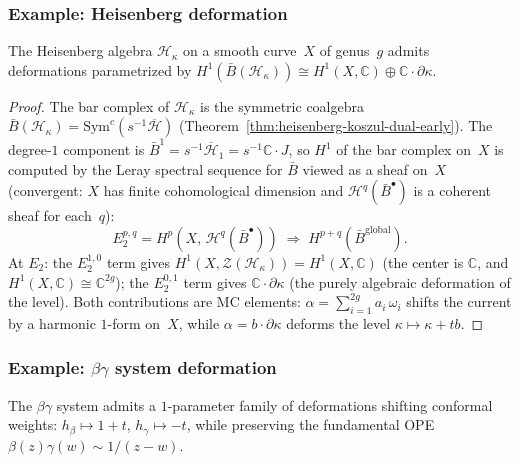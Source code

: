 \subsubsection{Example: Heisenberg deformation}

\begin{proposition}
\label{prop:deforming-heisenberg}
The Heisenberg algebra $\mathcal{H}_\kappa$ on a smooth curve~$X$ of
genus~$g$ admits deformations parametrized by
$H^1(\bar{B}(\mathcal{H}_\kappa)) \cong H^1(X, \mathbb{C}) \oplus
\mathbb{C} \cdot \partial\kappa$.
\end{proposition}

\begin{proof}
The bar complex of $\mathcal{H}_\kappa$ is the symmetric coalgebra
$\bar{B}(\mathcal{H}_\kappa) = \mathrm{Sym}^c(s^{-1}\overline{\mathcal{H}})$
(Theorem~\ref{thm:heisenberg-koszul-dual-early}).  The degree-$1$
component is $\bar{B}^1 = s^{-1}\overline{\mathcal{H}}_1 = s^{-1}
\mathbb{C} \cdot J$, so $H^1$ of the bar complex on~$X$ is computed
by the Leray spectral sequence for $\bar{B}$ viewed as a sheaf
on~$X$ (convergent: $X$ has finite cohomological dimension and
$\mathcal{H}^q(\bar{B}^\bullet)$ is a coherent sheaf for each~$q$):
\[
E_2^{p,q} = H^p(X,\, \mathcal{H}^q(\bar{B}^{\bullet}))
\;\Longrightarrow\; H^{p+q}(\bar{B}^{\mathrm{global}}).
\]
At $E_2$: the $E_2^{1,0}$ term gives
$H^1(X, \mathcal{Z}(\mathcal{H}_\kappa)) = H^1(X, \mathbb{C})$
(the center is $\mathbb{C}$, and $H^1(X, \mathbb{C}) \cong
\mathbb{C}^{2g}$); the $E_2^{0,1}$ term gives $\mathbb{C} \cdot
\partial\kappa$ (the purely algebraic deformation of the level).
Both contributions are MC elements:
$\alpha = \sum_{i=1}^{2g} a_i\, \omega_i$ shifts the current by a
harmonic $1$-form on~$X$, while $\alpha = b \cdot \partial\kappa$
deforms the level $\kappa \mapsto \kappa + tb$.
\end{proof}

\subsubsection{\texorpdfstring{Example: $\beta\gamma$ system deformation}{Example: beta-gamma system deformation}}

\begin{proposition}
\label{prop:betagamma-deformations}
The $\beta\gamma$ system admits a $1$-parameter family of deformations
shifting conformal weights:
$h_\beta \mapsto 1 + t$, $h_\gamma \mapsto -t$, while preserving the
fundamental OPE $\beta(z)\gamma(w) \sim 1/(z-w)$.
\end{proposition}

